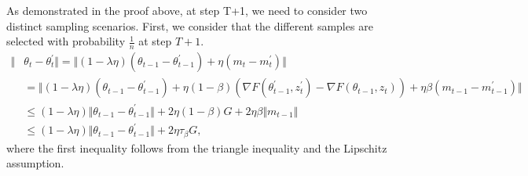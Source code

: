 As demonstrated in the proof above, at step T+1, we need to consider two distinct sampling scenarios. First, we consider that the different samples are selected with probability $\frac{1}{n}$ at step $T+1$.  
\begin{equation}
  \begin{aligned}
   \Vert &\theta_t -\theta_t^{\prime} \Vert = \Vert (1-\lambda \eta) (\theta_{t-1} - \theta_{t-1}^{\prime}) + \eta (m_t - m_t^{\prime})\Vert\\
   &= \Vert (1-\lambda \eta) (\theta_{t-1} - \theta_{t-1}^{\prime}) + \eta (1-\beta)(\nabla F(\theta_{t-1}^{\prime},z_{t}^{\prime}) - \nabla F(\theta_{t-1},z_{t})) + \eta \beta(m_{t-1} - m_{t-1}^{\prime})\Vert\\
    &\leq (1-\lambda \eta)\Vert\theta_{t-1} - \theta_{t-1}^{\prime}\Vert + 2\eta(1-\beta)G + 2\eta \beta\Vert m_{t-1}\Vert \\
    &\leq (1-\lambda \eta)\Vert\theta_{t-1} - \theta_{t-1}^{\prime}\Vert + 2\eta \tau_\beta G,
  \end{aligned}
 \end{equation}
where the first inequality follows from the triangle inequality and the Lipschitz assumption.



